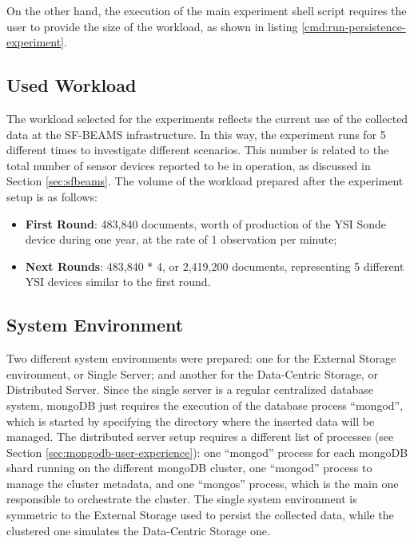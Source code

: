 On the other hand, the execution of the main experiment shell script requires
the user to provide the size of the workload, as shown in listing
\ref{cmd:run-persistence-experiment}.

\subsection{Used Workload}
\label{sec:workload}

The workload selected for the experiments reflects the current use of the
collected data at the SF-BEAMS infrastructure. In this way, the experiment
runs for 5 different times to investigate different scenarios. This number is
related to the total number of sensor devices reported to be in operation, as
discussed in Section \ref{sec:sfbeams}. The volume of the workload prepared
after the experiment setup is as follows:

\begin{itemize}
  \item \textbf{First Round}: 483,840 documents, worth of production of the 
  YSI Sonde device during one year, at the rate of 1 observation per minute;
  \item \textbf{Next Rounds}: 483,840 * 4, or 2,419,200 documents, representing
  5 different YSI devices similar to the first round.
\end{itemize}

\subsection{System Environment}

Two different system environments were prepared: one for the External Storage
environment, or Single Server; and another for the Data-Centric Storage, or
Distributed Server. Since the single server is a regular centralized database
system, mongoDB just requires the execution of the database process ``mongod'',
which is started by specifying the directory where the inserted data will be
managed. The distributed server setup requires a different list of processes
(see Section \ref{sec:mongodb-user-experience}): one ``mongod'' process for
each mongoDB shard running on the different mongoDB cluster, one ``mongod''
process to manage the cluster metadata, and one ``mongos'' process, which is
the main one responsible to orchestrate the cluster. The single system
environment is symmetric to the External Storage used to persist the collected
data, while the clustered one simulates the Data-Centric Storage one.

